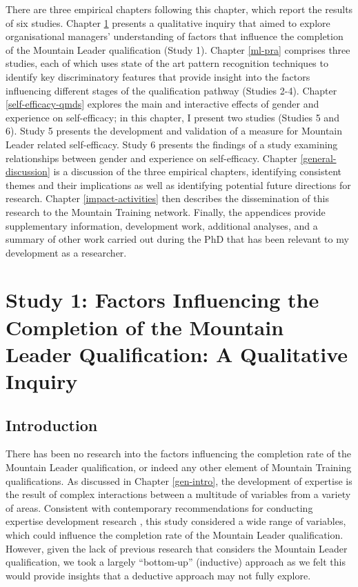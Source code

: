 \documentclass[
  12pt,
  a4paper,
]{book}
\begin{document}
There are three empirical chapters following this chapter, which report the results of six studies. Chapter \ref{ml-qualitative} presents a qualitative inquiry that aimed to explore organisational managers' understanding of factors that influence the completion of the Mountain Leader qualification (Study 1). Chapter \ref{ml-pra} comprises three studies, each of which uses state of the art pattern recognition techniques to identify key discriminatory features that provide insight into the factors influencing different stages of the qualification pathway (Studies 2-4). Chapter \ref{self-efficacy-qmds} explores the main and interactive effects of gender and experience on self-efficacy; in this chapter, I present two studies (Studies 5 and 6). Study 5 presents the development and validation of a measure for Mountain Leader related self-efficacy. Study 6 presents the findings of a study examining relationships between gender and experience on self-efficacy. Chapter \ref{general-discussion} is a discussion of the three empirical chapters, identifying consistent themes and their implications as well as identifying potential future directions for research. Chapter \ref{impact-activities} then describes the dissemination of this research to the Mountain Training network. Finally, the appendices provide supplementary information, development work, additional analyses, and a summary of other work carried out during the PhD that has been relevant to my development as a researcher.

\hypertarget{ml-qualitative}{%
\chapter{Study 1: Factors Influencing the Completion of the Mountain Leader Qualification: A Qualitative Inquiry}\label{ml-qualitative}}

\hypertarget{introduction}{%
\section{Introduction}\label{introduction}}

There has been no research into the factors influencing the completion rate of the Mountain Leader qualification, or indeed any other element of Mountain Training qualifications. As discussed in Chapter \ref{gen-intro}, the development of expertise is the result of complex interactions between a multitude of variables from a variety of areas. Consistent with contemporary recommendations for conducting expertise development research \citep[e.g.,][]{Gullich2019, Jones2019a, Rees2016}, this study considered a wide range of variables, which could influence the completion rate of the Mountain Leader qualification. However, given the lack of previous research that considers the Mountain Leader qualification, we took a largely ``bottom-up'' (inductive) approach as we felt this would provide insights that a deductive approach may not fully explore.
\end{document}
